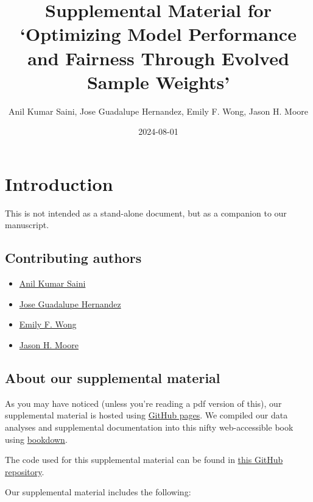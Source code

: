 \documentclass[
]{book}
\title{Supplemental Material for `Optimizing Model Performance and Fairness Through Evolved Sample Weights'}
\author{Anil Kumar Saini, Jose Guadalupe Hernandez, Emily F. Wong, Jason H. Moore}
\date{2024-08-01}
\providecommand{\tightlist}{%
  \setlength{\itemsep}{0pt}\setlength{\parskip}{0pt}}
\begin{document}
\maketitle

{
\setcounter{tocdepth}{1}
\tableofcontents
}
\hypertarget{introduction}{%
\chapter{Introduction}\label{introduction}}

This is not intended as a stand-alone document, but as a companion to our manuscript.

\hypertarget{contributing-authors}{%
\section{Contributing authors}\label{contributing-authors}}

\begin{itemize}
\tightlist
\item
  \href{https://theaksaini.github.io/}{Anil Kumar Saini}
\item
  \href{https://jgh9094.github.io/}{Jose Guadalupe Hernandez}
\item
  \href{https://www.cedars-sinai.edu/research-education/research/labs/bright/members.html}{Emily F. Wong}
\item
  \href{https://jasonhmoore.org/}{Jason H. Moore}
\end{itemize}

\hypertarget{about-our-supplemental-material}{%
\section{About our supplemental material}\label{about-our-supplemental-material}}

As you may have noticed (unless you're reading a pdf version of this), our supplemental material is hosted using \href{https://pages.github.com/}{GitHub pages}.
We compiled our data analyses and supplemental documentation into this nifty web-accessible book using \href{https://bookdown.org}{bookdown}.

The code used for this supplemental material can be found in \href{https://github.com/jgh9094/GPTP-2024-Lexicase-Analysis}{this GitHub repository}.

Our supplemental material includes the following:
\end{document}
